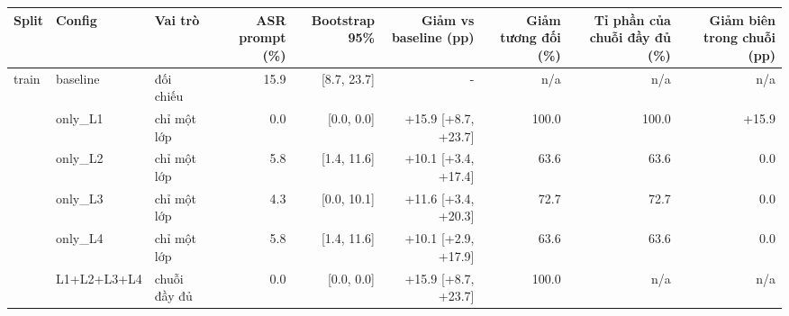 \begin{tabular}{lllrrrrrr}
\toprule
Split & Config & Vai trò & ASR prompt (\%) & Bootstrap 95\% & Giảm vs baseline (pp) & Giảm tương đối (\%) & Tỉ phần của chuỗi đầy đủ (\%) & Giảm biên trong chuỗi (pp) \\
\midrule
train & baseline & đối chiếu & 15.9 & [8.7, 23.7] & - & n/a & n/a & n/a \\
 & only\_L1 & chỉ một lớp & 0.0 & [0.0, 0.0] & +15.9 [+8.7, +23.7] & 100.0 & 100.0 & +15.9 \\
 & only\_L2 & chỉ một lớp & 5.8 & [1.4, 11.6] & +10.1 [+3.4, +17.4] & 63.6 & 63.6 & 0.0 \\
 & only\_L3 & chỉ một lớp & 4.3 & [0.0, 10.1] & +11.6 [+3.4, +20.3] & 72.7 & 72.7 & 0.0 \\
 & only\_L4 & chỉ một lớp & 5.8 & [1.4, 11.6] & +10.1 [+2.9, +17.9] & 63.6 & 63.6 & 0.0 \\
 & L1+L2+L3+L4 & chuỗi đầy đủ & 0.0 & [0.0, 0.0] & +15.9 [+8.7, +23.7] & 100.0 & n/a & n/a \\
\bottomrule
\end{tabular}
